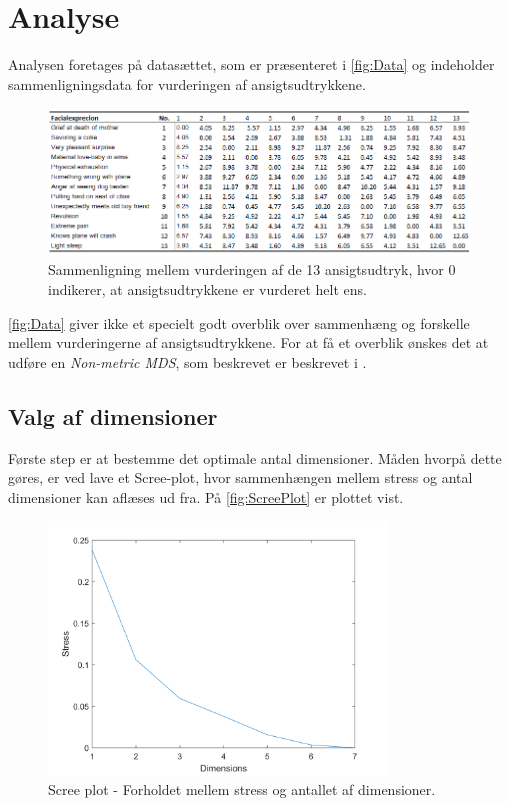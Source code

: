 \section*{Analyse}
\label{Analyse}
%
Analysen foretages på datasættet, som er præsenteret i \autoref{fig:Data} og indeholder sammenligningsdata for vurderingen af ansigtsudtrykkene. 

\begin{figure}[H]
\centering
\includegraphics[width = \textwidth]{Figure/Data.PNG} 
\caption{Sammenligning mellem vurderingen af de 13 ansigtsudtryk, hvor 0 indikerer, at ansigtsudtrykkene er vurderet helt ens.}
\label{fig:Data}
\end{figure}

\noindent \autoref{fig:Data} giver ikke et specielt godt overblik over sammenhæng og forskelle mellem vurderingerne af ansigtsudtrykkene. For at få et overblik ønskes det at udføre en \textit{Non-metric MDS}, som beskrevet er beskrevet i . 

\subsection*{Valg af dimensioner}
Første step er at bestemme det optimale antal dimensioner. Måden hvorpå dette gøres, er ved lave et Scree-plot, hvor sammenhængen mellem stress og antal dimensioner kan aflæses ud fra. På \autoref{fig:ScreePlot} er plottet vist. 

\begin{figure}[H]
\centering
\includegraphics[width = 0.8\textwidth]{Figure/screeplot.png} 
\caption{Scree plot - Forholdet mellem stress og antallet af dimensioner.}
\label{fig:ScreePlot}
\end{figure}

